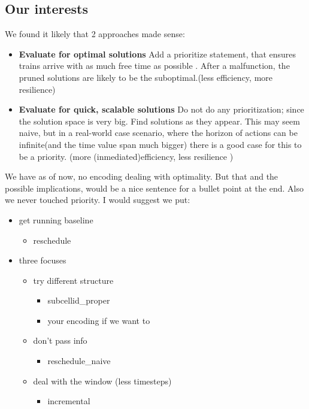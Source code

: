 \documentclass{llncs}
\begin{document}
\subsection{Our interests}
We found it likely that 2 approaches made sense:
\color{green}
\begin{itemize}
	\item  \textbf{Evaluate for optimal solutions} Add a prioritize statement, that ensures trains arrive with as much free time as possible . After a malfunction, the pruned solutions are likely to be the suboptimal.(less efficiency, more resilience)
	\item  \textbf{Evaluate for quick, scalable solutions} Do not do any prioritization; since the solution space is very big. Find solutions as they appear. This may seem naive, but in a real-world case scenario, where the horizon of actions can be infinite(and the time value span much bigger)  there is a good case for this to be a priority. (more (inmediated)efficiency, less resilience )
\end{itemize}
\color{black} \color{gray} We have as of now, no encoding dealing with optimality. But that and the possible implications, would be a nice sentence for a bullet point at the end. Also we never touched priority. I would suggest we put: \color{black}
\color{green}
\begin{itemize}
	\item get running baseline 
	\begin{itemize}
		\item reschedule
	\end{itemize}
	\item three focuses
	\begin{itemize}
		\item try different structure
		\begin{itemize}
			\item subcellid\_proper
			\item your encoding if we want to
		\end{itemize}
		\item don't pass info
		\begin{itemize}
			\item reschedule\_naive
		\end{itemize}
		\item deal with the window (less timesteps)
		\begin{itemize}
			\item incremental
		\end{itemize}
	\end{itemize}
\end{itemize}
\color{black}
\end{document}
